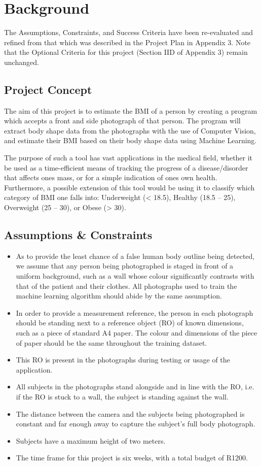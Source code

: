 \documentclass[conference]{IEEEtran}
\begin{document}
\section{Background}
The Assumptions, Constraints, and Success Criteria have been re-evaluated and refined from that which was described in the Project Plan in Appendix 3.
Note that the Optional Criteria for this project (Section IID of Appendix 3) remain unchanged.
\subsection{Project Concept} \label{concept}
The aim of this project is to estimate the BMI of a person by creating a program which accepts a front and side photograph of that person.
The program will extract body shape data from the photographs with the use of Computer Vision, and estimate their BMI based on their body shape data using Machine Learning.

The purpose of such a tool has vast applications in the medical field, whether it be used as a time-efficient means of tracking the progress of a disease/disorder that affects ones mass, or for a simple indication of ones own health.
Furthermore, a possible extension of this tool would be using it to classify which category of BMI one falls into: Underweight (< 18.5), Healthy (18.5 -- 25), Overweight (25 -- 30), or Obese (> 30).

\subsection{Assumptions \& Constraints}
\begin{itemize}
	\item As to provide the least chance of a false human body outline being detected, we assume that any person being photographed is staged in front of a uniform background, such as a wall whose colour significantly contrasts with that of the patient and their clothes.
	All photographs used to train the machine learning algorithm should abide by the same assumption.
	\item In order to provide a measurement reference, the person in each photograph should be standing next to a reference object (RO) of known dimensions, such as a piece of standard A4 paper. The colour and dimensions of the piece of paper should be the same throughout the training dataset.
	\item This RO is present in the photographs during testing or usage of the application.
	\item All subjects in the photographs stand alongside and in line with the RO, i.e. if the RO is stuck to a wall, the subject is standing against the wall.
	\item The distance between the camera and the subjects being photographed is constant and far enough away to capture the subject's full body photograph.
	\item Subjects have a maximum height of two meters.
	\item The time frame for this project is six weeks, with a total budget of R1200.
\end{itemize}
\end{document}
